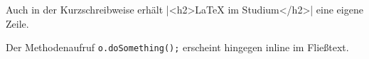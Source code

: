 Auch in der Kurzschreibweise erhält |<h2>LaTeX im Studium</h2>| eine eigene Zeile.

Der Methodenaufruf \texttt{o.doSomething();} erscheint hingegen inline im Fließtext.